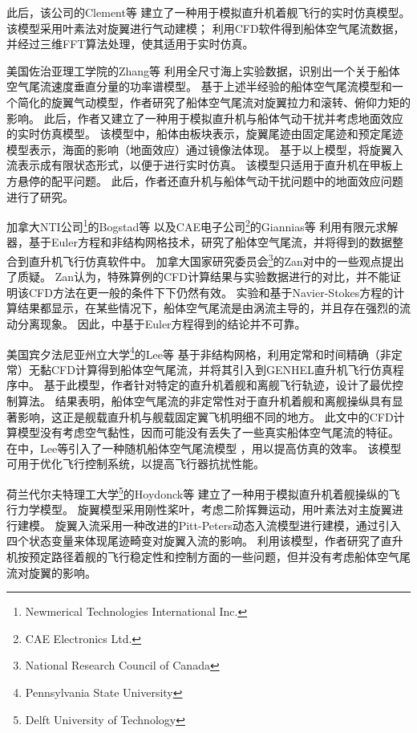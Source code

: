 \documentclass[doctor,openright,twoside,color]{buaathesis}
\begin{document}
此后，该公司的Clement等
建立了一种用于模拟直升机着舰飞行的实时仿真模型。
该模型采用叶素法对旋翼进行气动建模；
利用CFD软件得到船体空气尾流数据，并经过三维FFT算法处理，使其适用于实时仿真。

美国佐治亚理工学院的Zhang等
利用全尺寸海上实验数据，识别出一个关于船体空气尾流速度垂直分量的功率谱模型。
基于上述半经验的船体空气尾流模型和一个简化的旋翼气动模型，作者研究了船体空气尾流对旋翼拉力和滚转、俯仰力矩的影响。
此后，作者又建立了一种用于模拟直升机与船体气动干扰并考虑地面效应的实时仿真模型。
该模型中，船体由板块表示，旋翼尾迹由固定尾迹和预定尾迹模型表示，海面的影响（地面效应）通过镜像法体现。
基于以上模型，将旋翼入流表示成有限状态形式，以便于进行实时仿真。
该模型只适用于直升机在甲板上方悬停的配平问题。
此后，作者还直升机与船体气动干扰问题中的地面效应问题进行了研究。

加拿大NTI公司\footnote{Newmerical Technologies International Inc.}的Bogstad等
以及CAE电子公司\footnote{CAE Electronics Ltd.}的Giannias等
利用有限元求解器，基于Euler方程和非结构网格技术，研究了船体空气尾流，并将得到的数据整合到直升机飞行仿真软件中。
加拿大国家研究委员会\footnote{National Research Council of Canada}的Zan对\cite{Bogstad2002}中的一些观点提出了质疑。
Zan认为，特殊算例的CFD计算结果与实验数据进行的对比，并不能证明该CFD方法在更一般的条件下下仍然有效。
实验和基于Navier-Stokes方程的计算结果都显示，在某些情况下，船体空气尾流是由涡流主导的，并且存在强烈的流动分离现象。
因此，\cite{Bogstad2002}中基于Euler方程得到的结论并不可靠。

美国宾夕法尼亚州立大学\footnote{Pennsylvania State University}的Lee等
基于非结构网格，利用定常和时间精确（非定常）无黏CFD计算得到船体空气尾流，并将其引入到GENHEL直升机飞行仿真程序中。
基于此模型，作者针对特定的直升机着舰和离舰飞行轨迹，设计了最优控制算法。
结果表明，船体空气尾流的非定常性对于直升机着舰和离舰操纵具有显著影响，这正是舰载直升机与舰载固定翼飞机明细不同的地方。
此文中的CFD计算模型没有考虑空气黏性，因而可能没有丢失了一些真实船体空气尾流的特征。
在\cite{Lee2004}中，Lee等引入了一种随机船体空气尾流模型 ，用以提高仿真的效率。
该模型可用于优化飞行控制系统，以提高飞行器抗扰性能。

荷兰代尔夫特理工大学\footnote{Delft University of Technology}的Hoydonck等
建立了一种用于模拟直升机着舰操纵的飞行力学模型。
旋翼模型采用刚性桨叶，考虑二阶挥舞运动，用叶素法对主旋翼进行建模。
旋翼入流采用一种改进的Pitt-Peters动态入流模型进行建模，通过引入四个状态变量来体现尾迹畸变对旋翼入流的影响。
利用该模型，作者研究了直升机按预定路径着舰的飞行稳定性和控制方面的一些问题，但并没有考虑船体空气尾流对旋翼的影响。
\end{document}

